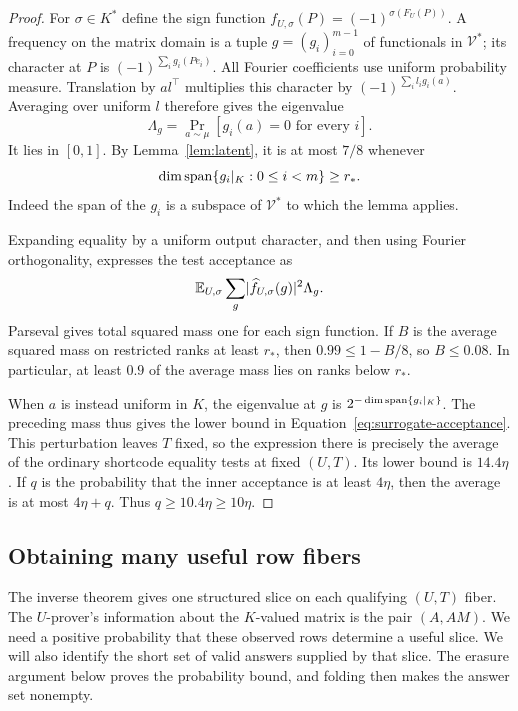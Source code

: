 \begin{proof}
For $\sigma\in K^*$ define the sign function
$f_{U,\sigma}(P)=(-1)^{\sigma(F_U(P))}$.  A frequency on the matrix
domain is a tuple $g=(g_i)_{i=0}^{m-1}$ of functionals in $\mathcal V^*$;
its character at $P$ is $(-1)^{\sum_i g_i(Pe_i)}$.  All Fourier
coefficients use uniform probability measure.  Translation by $a l^\top$
multiplies this character by $(-1)^{\sum_i l_i g_i(a)}$.  Averaging over
uniform $l$ therefore gives the eigenvalue
\[
 \Lambda_g=\Pr_{a\sim\mu}[g_i(a)=0\text{ for every }i].
\]
It lies in $[0,1]$.  By Lemma~\ref{lem:latent}, it is at most $7/8$
whenever
\[
 \dim\operatorname{span}\{g_i|_K:0\le i<m\}\ge r_*.
\]
Indeed the span of the $g_i$ is a subspace of $\mathcal V^*$ to which
the lemma applies.

Expanding equality by a uniform output character, and then using Fourier
orthogonality, expresses the test acceptance as
\[
 \mathbb E_{U,\sigma}\sum_g
      \lvert \widehat f_{U,\sigma}(g)\rvert^2\Lambda_g.
\]
Parseval gives total squared mass one for each sign function.  If $B$ is
the average squared mass on restricted ranks at least $r_*$, then
$0.99\le1-B/8$, so $B\le0.08$.  In particular, at least $0.9$ of the
average mass lies on ranks below $r_*$.

When $a$ is instead uniform in $K$, the eigenvalue at $g$ is
$2^{-\dim\operatorname{span}\{g_i|_K\}}$.  The preceding mass thus gives the lower
bound in Equation~\eqref{eq:surrogate-acceptance}.  This perturbation
leaves $T$ fixed, so the expression there is precisely the average of the
ordinary shortcode equality tests at fixed $(U,T)$.  Its lower bound is
$14.4\eta$.  If $q$ is the probability that the inner acceptance is at
least $4\eta$, then the average is at most $4\eta+q$.  Thus
$q\ge10.4\eta\ge10\eta$.
\end{proof}

\subsection{Obtaining many useful row fibers}

The inverse theorem gives one structured slice on each qualifying
$(U,T)$ fiber.  The $U$-prover's information about the $K$-valued matrix
is the pair $(A,AM)$.  We need a positive probability that these observed rows determine
a useful slice.  We will also identify the short set of valid answers
supplied by that slice.  The erasure argument below proves the probability
bound, and folding then makes the answer set nonempty.

